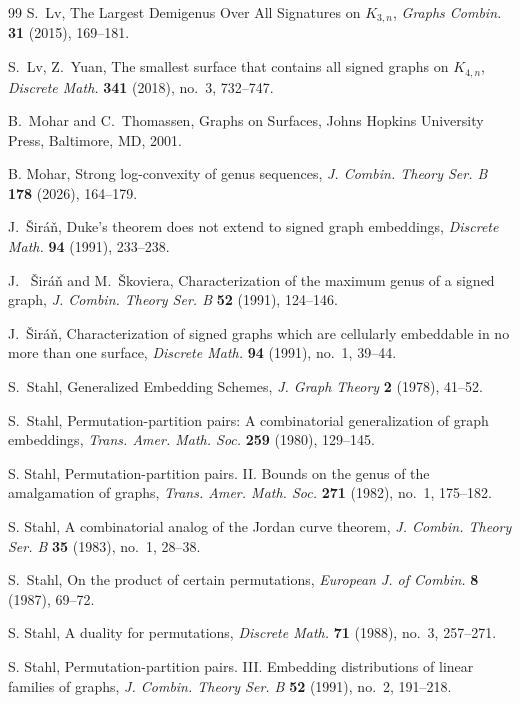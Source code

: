 \documentclass[12pt]{article}
\theoremstyle{definition}
\begin{document}
\begin{thebibliography}{99}
S.~Lv, The Largest Demigenus Over All Signatures on $K_{3,n}$, \emph{Graphs Combin.} \textbf{31} (2015), 169--181.


S.~Lv, Z.~Yuan,
The smallest surface that contains all signed graphs on $K_{4,n}$,
\emph{Discrete Math.} \textbf{341} (2018), no.~3, 732--747.

B.~Mohar and C.~Thomassen,
Graphs on Surfaces,
Johns Hopkins University Press, Baltimore, MD, 2001.


B. Mohar,
Strong log-convexity of genus sequences,
\emph{J. Combin. Theory Ser. B} \textbf{178} (2026), 164--179.



J.~\v{S}ir\'a\v{n},
Duke's theorem does not extend to signed graph embeddings,
\emph{Discrete Math.} \textbf{94} (1991), 233--238.



J. ~\v{S}ir\'a\v{n} and M.~\v{S}koviera,
Characterization of the maximum genus of a signed graph,
\emph{J. Combin. Theory Ser. B} \textbf{52} (1991), 124--146.


J.~\v Sir\'a\v n, Characterization of signed graphs which are cellularly embeddable in no more than one surface, \emph{Discrete Math.} {\bf 94} (1991), no.~1, 39--44.


S.~Stahl,
Generalized Embedding Schemes, \emph{J. Graph Theory} \textbf{2} (1978), 41--52.

S.~Stahl,
Permutation-partition pairs: A combinatorial generalization of graph embeddings,
\emph{Trans. Amer. Math. Soc.} \textbf{259} (1980), 129--145.

S. Stahl, Permutation-partition pairs. II. Bounds on the genus of the amalgamation of graphs, \emph{Trans. Amer. Math. Soc.} {\bf 271} (1982), no.~1, 175--182.

S. Stahl, A combinatorial analog of the Jordan curve theorem, \emph{J. Combin. Theory Ser. B} {\bf 35} (1983), no.~1, 28--38.

S.~Stahl,
 On the product of certain permutations,
\emph{European J. of Combin.} \textbf{8} (1987),
69--72.

S. Stahl, A duality for permutations,\emph{ Discrete Math.} {\bf 71} (1988), no.~3, 257--271.

S. Stahl, Permutation-partition pairs. III. Embedding distributions of linear families of graphs, \emph{J. Combin. Theory Ser. B} {\bf 52} (1991), no.~2, 191--218.


\end{thebibliography}
\end{document}
